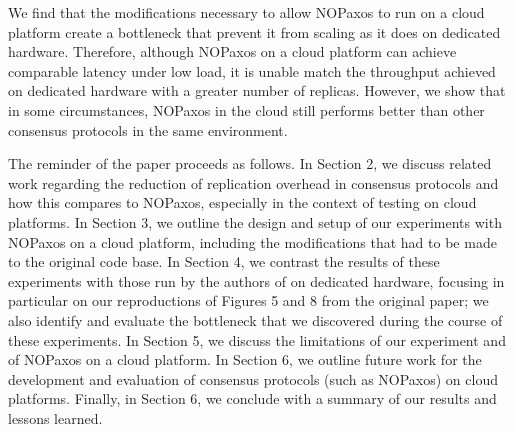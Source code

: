 We find that the modifications necessary to allow NOPaxos to run on a cloud platform create a bottleneck that prevent it from scaling as it does on dedicated hardware. Therefore, although NOPaxos on a cloud platform can achieve comparable latency under low load, it is unable match the throughput achieved on dedicated hardware with a greater number of replicas. However, we show that in some circumstances, NOPaxos in the cloud still performs better than other consensus protocols in the same environment.

The reminder of the paper proceeds as follows. In Section 2, we discuss related work regarding the reduction of replication overhead in consensus protocols and how this compares to NOPaxos, especially in the context of testing on cloud platforms. In Section 3, we outline the design and setup of our experiments with NOPaxos on a cloud platform, including the modifications that had to be made to the original code base. In Section 4, we contrast the results of these experiments with those run by the authors of \cite{nopaxos} on dedicated hardware, focusing in particular on our reproductions of Figures 5 and 8 from the original paper; we also identify and evaluate the bottleneck that we discovered during the course of these experiments. In Section 5, we discuss the limitations of our experiment and of NOPaxos on a cloud platform. In Section 6, we outline future work for the development and evaluation of consensus protocols (such as NOPaxos) on cloud platforms. Finally, in Section 6, we conclude with a summary of our results and lessons learned. 